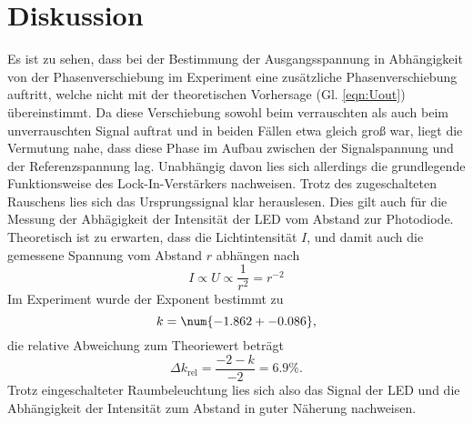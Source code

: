 \section{Diskussion}
Es ist zu sehen, dass bei der Bestimmung der Ausgangsspannung in Abhängigkeit von der Phasenverschiebung im Experiment eine zusätzliche Phasenverschiebung auftritt, welche nicht mit der theoretischen Vorhersage (Gl. \eqref{eqn:Uout}) übereinstimmt. Da diese Verschiebung sowohl beim verrauschten als auch beim unverrauschten Signal auftrat und in beiden Fällen etwa gleich groß war, liegt die Vermutung nahe, dass diese Phase im Aufbau zwischen der Signalspannung und der Referenzspannung lag. Unabhängig davon lies sich allerdings die grundlegende Funktionsweise des Lock-In-Verstärkers nachweisen. Trotz des zugeschalteten Rauschens lies sich das Ursprungssignal klar herauslesen. Dies gilt auch für die Messung der Abhägigkeit der Intensität der LED vom Abstand zur Photodiode. Theoretisch ist zu erwarten, dass die Lichtintensität $I$, und damit auch die gemessene Spannung vom Abstand $r$ abhängen nach
\begin{equation*}
    I \propto U \propto \frac{1}{r^2} = r^{-2}
\end{equation*}
Im Experiment wurde der Exponent bestimmt zu
\begin{equation*}
    k = \num{-1.862 +- 0.086},
\end{equation*}
die relative Abweichung zum Theoriewert beträgt
\begin{equation*}
    \Delta k_\text{rel} = \frac{-2 - k}{-2} = 6.9 \% .
\end{equation*}
Trotz eingeschalteter Raumbeleuchtung lies sich also das Signal der LED und die Abhängigkeit der Intensität zum Abstand in guter Näherung nachweisen.